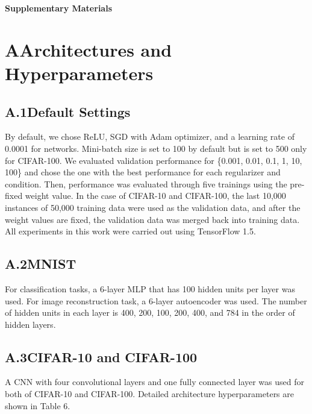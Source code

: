 \onecolumn

\begin{center}
	\textbf{\LARGE Supplementary Materials}
\end{center}

\bigskip

\section*{A\quad Architectures and Hyperparameters}

\bigskip

\subsection*{A.1\quad Default Settings}
By default, we chose ReLU, SGD with Adam optimizer, and a learning rate of 0.0001 for networks. Mini-batch size is set to 100 by default but is set to 500 only for CIFAR-100. We evaluated validation performance for \{0.001, 0.01, 0.1, 1, 10, 100\} and chose the one 
with the best performance for each regularizer and condition.
Then, performance was evaluated through five trainings 
using the pre-fixed weight value. In the case of CIFAR-10 and CIFAR-100, 
the last 10,000 instances of 50,000 training data were used as the validation data,
and after the weight values are fixed, the validation data was merged back into training data. All experiments in this work were carried out using TensorFlow 1.5.

\bigskip

\subsection*{A.2\quad MNIST}
For classification tasks, a 6-layer MLP that has 100 hidden units per layer was used. For image reconstruction task, a 6-layer autoencoder was used. The number of hidden units in each layer is 400, 200, 100, 200, 400, and 784 in the order of hidden layers. 

\bigskip

\subsection*{A.3\quad CIFAR-10 and CIFAR-100}
A CNN with four convolutional layers and one fully connected layer was used for both of CIFAR-10 and CIFAR-100. Detailed architecture hyperparameters are shown in Table 6.


